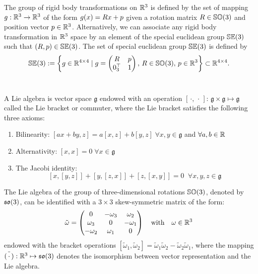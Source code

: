 \begin{definition} The group of rigid body transformations on $\mathbb{R}^3$ is defined by the set of mapping ${g}: \mathbb{R}^3 \to \mathbb{R}^3$ of the form ${g} ({x}) = {R} {x} + {p}$ given a rotation matrix ${R} \in {\mathbb{SO}(3)}$ and position vector ${p} \in \mathbb{R}^3$. Alternatively, we can associate any rigid body transformation in $\mathbb{R}^3$ space by an element of the special euclidean group ${\mathbb{SE}(3)}$ such that $({R},{p}) \in {\mathbb{SE}(3)}$. The set of special euclidean group ${\mathbb{SE}(3)}$ is defined by
\begin{equation}
{\mathbb{SE}(3)} := \left\{ {g} \in \mathbb{R}^{4 \times 4} \;|\; {g} = \begin{pmatrix} {R} & {p} \\ {0}_3^\top & 1 \end{pmatrix}, \, {R} \in {\mathbb{SO}(3)},\, {p} \in \mathbb{R}^3 \right\} \subset \mathbb{R}^{4\times 4}.
\end{equation}\
\end{definition}

\begin{definition}[The Lie algebra] A Lie algebra is vector space $\mathfrak{g}$ endowed with an operation $[\,\cdot,\,\cdot\,]:\, \mathfrak{g} \times \mathfrak{g} \mapsto \mathfrak{g}$ called the Lie bracket or commuter, where the Lie bracket satisfies the following three axioms: 
\begin{enumerate}
\itemsep0.5em 
\item Bilinearity: $[ax + by,z] = a[x,z] + b[y,z] \; \forall x,y\in \mathfrak{g}$ and $\forall a,b \in \mathbb{R}$
\item Alternativity: $[x,x] =  0 \; \forall x\in \mathfrak{g}$
\item The Jacobi identity: $$ [x,[y,z]] + [y,[z,x]] + [z,[x,y]] = 0 \;\; \forall x,y,z\in \mathfrak{g}$$
\end{enumerate}
\end{definition}

\begin{definition}
The Lie algebra of the group of three-dimensional rotations ${\mathbb{SO}(3)}$, denoted by ${\mathfrak{so}(3)}$, can be identified with a $3 \times 3$ skew-symmetric matrix of the form:
\begin{equation}
\tilde{{\omega}} = 
\begin{pmatrix} 0 & -\omega_3 & \omega_2 \\ \omega_3 & 0 & -\omega_1 \\ -\omega_2 & \omega_1 & 0 \end{pmatrix} \quad \text{with} \quad \omega \in \mathbb{R}^3
\end{equation}
endowed with the bracket operations $[\tilde{\omega}_1,\tilde{\omega}_2] = \tilde{\omega}_1\tilde{\omega}_2 - \tilde{\omega}_2 \tilde{\omega}_1$, where the mapping $\tilde{(\,\cdot\,)}: \mathbb{R}^3 \mapsto {\mathfrak{so}(3)}$ denotes the isomorphism between vector representation and the Lie algebra.
\end{definition}

